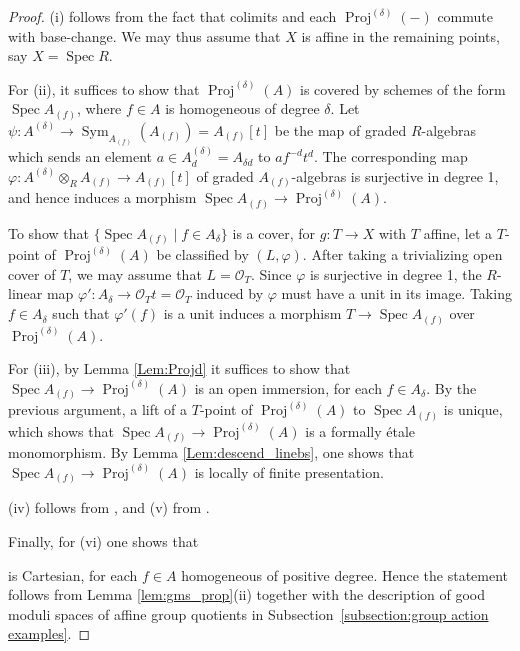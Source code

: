 \documentclass[a4paper,twoside,11pt]{amsart}
\theoremstyle{plain}
\theoremstyle{definition}
\theoremstyle{remark}
\numberwithin{equation}{section}
\newcommand{\GG}{\mathbb{G}} %
\DeclareMathOperator{\Sym}{Sym} %
\DeclareMathOperator{\Spec}{Spec} %
\DeclareMathOperator{\Proj}{Proj} %
\newcommand{\oO}{\mathcal{O}}
\begin{document}
\begin{proof}

    (i) follows from the fact that colimits and each $\Proj^{(\delta)}(-)$ commute with base-change. We may thus assume that $X$ is affine in the remaining points, say $X = \Spec R$.

    For (ii), it suffices to show that $\Proj^{(\delta)}(A)$ is covered by schemes of the form $\Spec A_{(f)}$, where $f \in A$ is homogeneous of degree $\delta$. Let $\psi \colon A^{(\delta)} \to \Sym_{A_{(f)}}(A_{(f)}) = A_{(f)}[t]$ be the map of graded $R$-algebras which sends an element $a \in A^{(\delta)}_d = A_{\delta d}$ to $af^{- d}t^{d}$. The corresponding map $\varphi \colon A^{(\delta)} \otimes_R A_{(f)} \to A_{(f)}[t]$ of graded $A_{(f)}$-algebras is surjective in degree 1, and hence induces a morphism $\Spec A_{(f)} \to \Proj^{(\delta)}(A)$.

    To show that $\{ \Spec A_{(f)} \mid f \in A_\delta \}$ is a cover, for $g \colon T \to X$ with $T$ affine, let a $T$-point of $\Proj^{(\delta)}(A)$ be classified by $(L,\varphi)$. After taking a trivializing open cover of $T$, we may assume that $L = \oO_T$. Since $\varphi$ is surjective in degree 1, the $R$-linear map $\varphi' \colon A_\delta \to \oO_Tt = \oO_T$ induced by $\varphi$ must have a unit in its image. Taking $f \in A_\delta$ such that $\varphi'(f)$ is a unit induces a morphism $T \to \Spec A_{(f)}$ over $\Proj^{(\delta)}(A)$.

    For (iii), by Lemma \ref{Lem:Projd} it suffices to show that $\Spec A_{(f)} \to \Proj^{(\delta)}(A)$ is an open immersion, for each $f \in A_\delta$. By the previous argument, a lift of a $T$-point of $\Proj^{(\delta)}(A)$ to $\Spec A_{(f)}$ is unique, which shows that $\Spec A_{(f)} \to \Proj^{(\delta)}(A)$ is a formally \'{e}tale monomorphism. By Lemma \ref{Lem:descend_linebs}, one shows that $\Spec A_{(f)} \to \Proj^{(\delta)}(A)$ is locally of finite presentation.

    (iv) follows from \cite[Prop.~5.5.5]{Hekking}, and (v) from \cite[\href{https://stacks.math.columbia.edu/tag/01NS}{Tag 01NS}]{stacks-project}.

    Finally, for (vi) one shows that 
    \begin{center}
    \end{center}
    is Cartesian, for each $f \in A$ homogeneous of positive degree. Hence the statement follows from Lemma \ref{lem:gms_prop}(ii) together with the description of good moduli spaces of affine group quotients in Subsection~\ref{subsection:group action examples}.
\end{proof}
\end{document}
